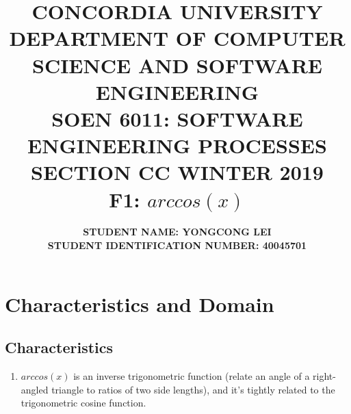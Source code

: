 \documentclass[10pt]{article}
\title{{\large \textbf{CONCORDIA UNIVERSITY \\ DEPARTMENT OF COMPUTER SCIENCE AND SOFTWARE ENGINEERING \\ SOEN 6011: SOFTWARE ENGINEERING PROCESSES \\ SECTION CC WINTER 2019 \\ F1: $arccos(x)$}  \\ }}
\author{\normalsize \textbf {STUDENT NAME: YONGCONG LEI} \\ \normalsize \textbf{STUDENT IDENTIFICATION NUMBER: 40045701 }}
\date{}
\begin{document}
\maketitle

\section{Characteristics and Domain}
\subsection{Characteristics}

\begin{enumerate}
    \item $arccos(x)$ is an inverse trigonometric function (relate an angle of a right-angled triangle to ratios of two side lengths), and it's tightly related to the trigonometric cosine function.
    

\end{enumerate}
\end{document}
